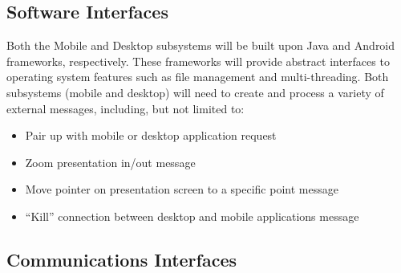 \documentclass{article}
\begin{document}
\subsection{Software Interfaces}

Both the Mobile and Desktop subsystems will be built upon Java and Android frameworks, respectively. These frameworks will provide abstract interfaces to operating system features such as file management and multi-threading. Both subsystems (mobile and desktop) will need to create and process a variety of external messages, including, but not limited to:
\begin{itemize}
\item Pair up with mobile or desktop application request
\item Zoom presentation in/out message
\item Move pointer on presentation screen to a specific point message
\item “Kill” connection between desktop and mobile applications message
\end{itemize}

\subsection{Communications Interfaces}
\end{document}
